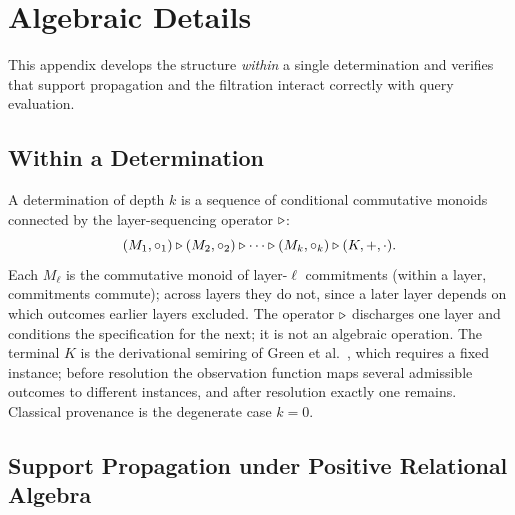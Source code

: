 \section{Algebraic Details}
\label{app:algebra}

This appendix develops the structure \emph{within} a single determination and
verifies that support propagation and the filtration interact correctly with
query evaluation.

\subsection{Within a Determination}
\label{app:within}

A determination of depth $k$ is a sequence of conditional commutative monoids
connected by the layer-sequencing operator $\mathbin{\triangleright}$:
\[
  (M_1, \circ_1) \mathbin{\triangleright} (M_2, \circ_2) \mathbin{\triangleright} \cdots \mathbin{\triangleright} (M_k, \circ_k)
  \mathbin{\triangleright} (K, +, \cdot).
\]
Each $M_\ell$ is the commutative monoid of layer-$\ell$ commitments (within a
layer, commitments commute); across layers they do not, since a later layer
depends on which outcomes earlier layers excluded. The operator $\mathbin{\triangleright}$
discharges one layer and conditions the specification for the next; it is not
an algebraic operation. The terminal $K$ is the derivational semiring of Green
et al.~\cite{green2007provenance}, which requires a fixed instance; before
resolution the observation function maps several admissible outcomes to
different instances, and after resolution exactly one remains. Classical
provenance is the degenerate case $k = 0$.

\subsection{Support Propagation under Positive Relational Algebra}
\label{app:propagation}

